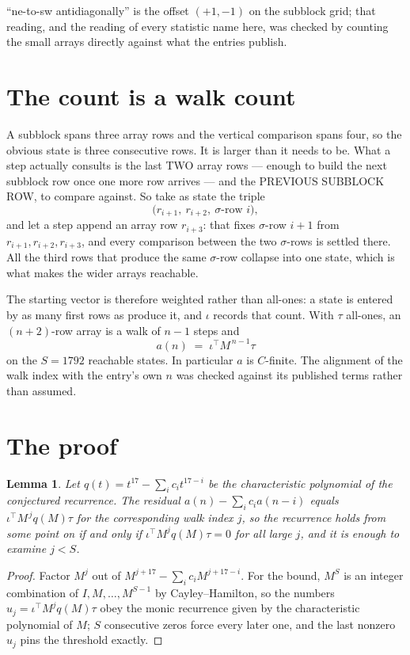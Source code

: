 \documentclass[11pt,a4paper]{article}
\theoremstyle{plain}
\newtheorem{lemma}[theorem]{Lemma}
\theoremstyle{definition}
\begin{document}
``ne-to-sw antidiagonally'' is the offset $(+1,-1)$ on the subblock grid; that reading, and
the reading of every statistic name here, was checked by counting the small arrays directly
against what the entries publish.

\section{The count is a walk count}

A subblock spans three array rows and the vertical comparison spans four, so the obvious state
is three consecutive rows. It is larger than it needs to be. What a step actually consults is
the last TWO array rows --- enough to build the next subblock row once one more row arrives ---
and the PREVIOUS SUBBLOCK ROW, to compare against. So take as state the triple
\[
\bigl(r_{i+1},\ r_{i+2},\ \sigma\text{-row }i\bigr),
\]
and let a step append an array row $r_{i+3}$: that fixes $\sigma$-row $i+1$ from
$r_{i+1},r_{i+2},r_{i+3}$, and every comparison between the two $\sigma$-rows is settled
there. All the third rows that produce the same $\sigma$-row collapse into one state, which is
what makes the wider arrays reachable.

The starting vector is therefore weighted rather than all-ones: a state is entered by as many
first rows as produce it, and $\iota$ records that count. With $\tau$ all-ones, an
$(n+2)$-row array is a walk of $n-1$ steps and
\[
a(n)\;=\;\iota^{\!\top}M^{\,n-1}\tau
\]
on the $S=1792$ reachable states. In particular $a$ is $C$-finite. The alignment of the walk
index with the entry's own $n$ was checked against its published terms rather than assumed.

\section{The proof}

\begin{lemma}\label{lem:crit}
Let $q(t)=t^{17}-\sum_i c_it^{17-i}$ be the characteristic polynomial of the
conjectured recurrence. The residual $a(n)-\sum_ic_ia(n-i)$ equals
$\iota^{\!\top}M^{\,j}q(M)\tau$ for the corresponding walk index $j$, so the recurrence
holds from some point on if and only if $\iota^{\!\top}M^{j}q(M)\tau=0$ for all large $j$,
and it is enough to examine $j<S$.
\end{lemma}

\begin{proof}
Factor $M^{j}$ out of $M^{j+17}-\sum_ic_iM^{j+17-i}$. For the bound, $M^{S}$
is an integer combination of $I,M,\dots,M^{S-1}$ by Cayley--Hamilton, so the numbers
$u_j=\iota^{\!\top}M^{j}q(M)\tau$ obey the monic recurrence given by the characteristic
polynomial of $M$; $S$ consecutive zeros force every later one, and the last nonzero $u_j$
pins the threshold exactly.
\end{proof}
\end{document}
